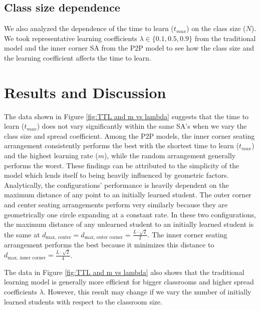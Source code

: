 \documentclass[10pt,a4paper,twoside]{article}
\begin{document}
\subsection{Class size dependence}
We also analyzed the dependence of the time to learn ($t_{max}$) on the class size ($N$). We took representative learning coefficients $\lambda \in \lbrace 0.1, 0.5, 0.9 \rbrace$ from the traditional model and the inner corner SA from the P2P model to see how the class size and the learning coefficient affects the time to learn. %

\section{Results and Discussion}
The data shown in Figure \ref{fig:TTL and m vs lambda} suggests that the time to learn ($t_{max}$) does not vary significantly within the same SA's when we vary the class size and spread coefficient. Among the P2P models, the inner corner seating arrangement consistently performs the best with the shortest time to learn ($t_{max}$) and the highest learning rate ($m$), while the random arrangement generally performs the worst. These findings can be attributed to the simplicity of the model which lends itself to being heavily influenced by geometric factors. Analytically, the configurations’ performance is heavily dependent on the maximum distance of any point to an initially learned student. The outer corner and center seating arrangements perform very similarly because they are geometrically one circle expanding at a constant rate. In these two configurations, the maximum distance of any unlearned student to an initially learned student is the same at $d_{\text{max, center}} = d_{\text{max, outer corner}}=\frac{L\cdot\sqrt{2}}{2}$. The inner corner seating arrangement performs the best because it minimizes this distance to $d_{\text{max, inner corner}}=\frac{L\cdot\sqrt{2}}{4}$.

\noindent The data in Figure \ref{fig:TTL and m vs lambda} also shows that the traditional learning model is generally more efficient for bigger classrooms and higher spread coefficients $\lambda$. However, this result may change if we vary the number of initially learned students with respect to the classroom size.
\end{document}
